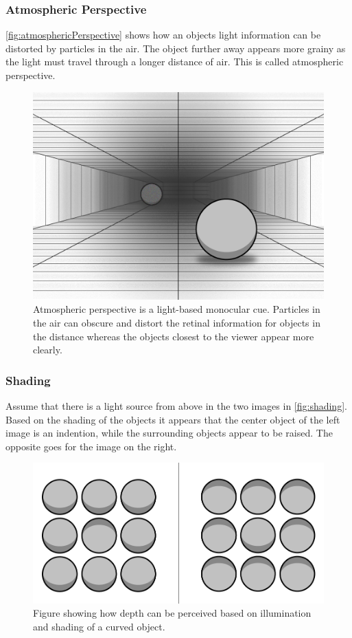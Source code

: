 \subsubsection{Atmospheric Perspective}
\autoref{fig:atmosphericPerspective} shows how an objects light information can be distorted by particles in the air. The object further away appears more grainy as the light must travel through a longer distance of air. This is called atmospheric perspective. 
\begin{figure}[H]
	\centering
	\includegraphics[width=1\linewidth]{figure/Analysis/atmosphericPerspective.png}
	\caption{Atmospheric perspective is a light-based monocular cue. Particles in the air can obscure and distort the retinal information for objects in the distance whereas the objects closest to the viewer appear more clearly.}
	\label{fig:atmosphericPerspective}
\end{figure}

\subsubsection{Shading}
Assume that there is a light source from above in the two images in \autoref{fig:shading}. Based on the shading of the objects it appears that the center object of the left image is an indention, while the surrounding objects appear to be raised. The opposite goes for the image on the right\citep{sensationPerception}.
\begin{figure}[H]
	\centering
	\includegraphics[width=0.8\linewidth]{figure/Analysis/shading.png}
	\caption{Figure showing how depth can be perceived based on illumination and shading of a curved object.}
	\label{fig:shading}
\end{figure}

